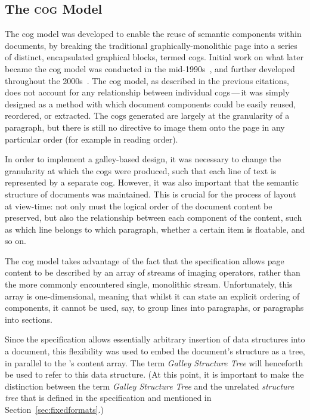 \subsection{The \textsc{cog} Model}
The \gls{cog} model was developed to enable the reuse of semantic components within \pdf{} documents, by breaking the traditional graphically-monolithic \pdf{} page into a series of distinct, encapsulated graphical blocks, termed \glspl{cog}. Initial work on what later became the \gls{cog} model was conducted in the mid-1990s~\cite{Smith1995}, and further developed throughout the 2000s~\cite{Bagley2003,Bagley2004a,Bagley2005,Macdonald2005,Bagley2006,Bagley2007}. The \gls{cog} model, as described in the previous citations, does not account for any relationship between individual \glspl{cog}\,---\,it was simply designed as a method with which document components could be easily reused, reordered, or extracted. The \glspl{cog} generated are largely at the granularity of a paragraph, but there is still no directive to image them onto the page in any particular order (for example in reading order).

In order to implement a galley-based design, it was necessary to change the granularity at which the \glspl{cog} were produced, such that each line of text is represented by a separate \gls{cog}. However, it was also important that the semantic structure of documents was maintained. This is crucial for the process of layout at view-time: not only must the logical order of the document content be preserved, but also the relationship between each component of the content, such as which line belongs to which paragraph, whether a certain item is floatable, and so on.

The \gls{cog} model takes advantage of the fact that the \pdf{} specification \cite{Adobe2001} allows page content to be described by an array of streams of imaging operators, rather than the more commonly encountered single, monolithic stream. Unfortunately, this array is one-di\-men\-sional, meaning that whilst it can state an explicit ordering of components, it cannot be used, say, to group lines into paragraphs, or paragraphs into sections.

Since the \pdf{} specification allows essentially arbitrary  insertion of data structures into a document, this flexibility was used to embed the document's structure as a tree, in parallel to the \pdf{}'s content array. The term \emph{Galley Structure Tree} will henceforth be used to refer to this data structure. (At this point, it is important to make the distinction between the term \emph{Galley Structure Tree} and the unrelated \emph{structure tree} that is defined in the \pdf{} specification and mentioned in Section~\ref{sec:fixedformats}.)

